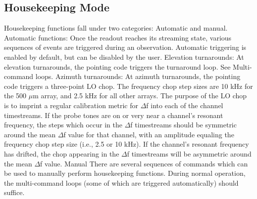 \subsection{Housekeeping Mode}
Housekeeping functions fall under two categories: Automatic and manual.
Automatic functions:
Once the readout reaches its streaming state, various sequences of events are triggered during an observation. Automatic triggering is enabled by default, but can be disabled by the user.
Elevation turnarounds: At elevation turnarounds, the pointing code triggers the turnaround loop. See Multi-command loops.
Azimuth turnarounds: At azimuth turnarounds, the pointing code triggers a three-point LO chop. The frequency chop step sizes are 10 kHz for the 500 $\mu$m array, and 2.5 kHz for all other arrays. The purpose of the LO chop is to imprint a regular calibration metric for $\Delta$f into each of the channel timestreams. If the probe tones are on or very near a channel’s resonant frequency, the steps which occur in the $\Delta$f timestreams should be symmetric around the mean $\Delta$f value for that channel, with an amplitude equaling the frequency chop step size (i.e., 2.5 or 10 kHz). If the channel's resonant frequency has drifted, the chop appearing in the $\Delta$f timestreams will be asymmetric around the mean $\Delta$f value.
Manual
There are several sequences of commands which can be used to manually perform housekeeping functions. During normal operation, the multi-command loops (some of which are triggered automatically) should suffice.

